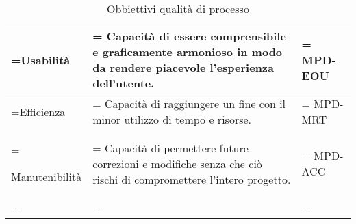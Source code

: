 \begin{xltabular}{\textwidth} {
        >{\hsize\linewidth=\hsize}X
        >{\hsize\linewidth=\hsize}X
        >{\hsize\linewidth=\hsize}X
    }
    Usabilità &
    Capacità di essere comprensibile e graficamente
    armonioso in modo da rendere piacevole l'esperienza
    dell'utente. &
    MPD-EOU
    \\ \hline

    Efficienza &
    Capacità di raggiungere un fine con il minor utilizzo di
    tempo e risorse. &
    MPD-MRT
    \\ \hline

    Manutenibilità &
    Capacità di permettere future correzioni e modifiche
    senza che ciò rischi di compromettere l'intero progetto. &
    MPD-ACC
    \\ \hline

    \caption{Obbiettivi qualità di processo}
\end{xltabular}